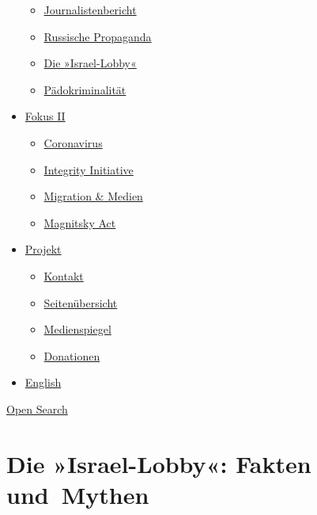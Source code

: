 \begin{itemize}
  \begin{itemize}
  \tightlist
  \item
    \href{https://swprs.org/bericht-eines-journalisten/}{Journalistenbericht}
  \item
    \href{https://swprs.org/russische-propaganda/}{Russische Propaganda}
  \item
    \href{https://swprs.org/die-israel-lobby-fakten-und-mythen/}{Die
    »Israel-Lobby«}
  \item
    \href{https://swprs.org/geopolitik-und-paedokriminalitaet/}{Pädokriminalität}
  \end{itemize}
\item
  \href{https://swprs.org/migration-und-medien/}{Fokus II}

  \begin{itemize}
  \tightlist
  \item
    \href{https://swprs.org/covid-19-hinweis-ii/}{Coronavirus}
  \item
    \href{https://swprs.org/die-integrity-initiative/}{Integrity
    Initiative}
  \item
    \href{https://swprs.org/migration-und-medien/}{Migration \& Medien}
  \item
    \href{https://swprs.org/der-fall-magnitsky/}{Magnitsky Act}
  \end{itemize}
\item
  \href{https://swprs.org/kontakt/}{Projekt}

  \begin{itemize}
  \tightlist
  \item
    \href{https://swprs.org/kontakt/}{Kontakt}
  \item
    \href{https://swprs.org/uebersicht/}{Seitenübersicht}
  \item
    \href{https://swprs.org/medienspiegel/}{Medienspiegel}
  \item
    \href{https://swprs.org/donationen/}{Donationen}
  \end{itemize}
\item
  \href{https://swprs.org/contact/}{English}
\end{itemize}

\protect\hyperlink{}{Open Search}

\hypertarget{die-israel-lobby-fakten-und-mythen}{%
\section{Die »Israel-Lobby«: Fakten
und~Mythen}\label{die-israel-lobby-fakten-und-mythen}}

